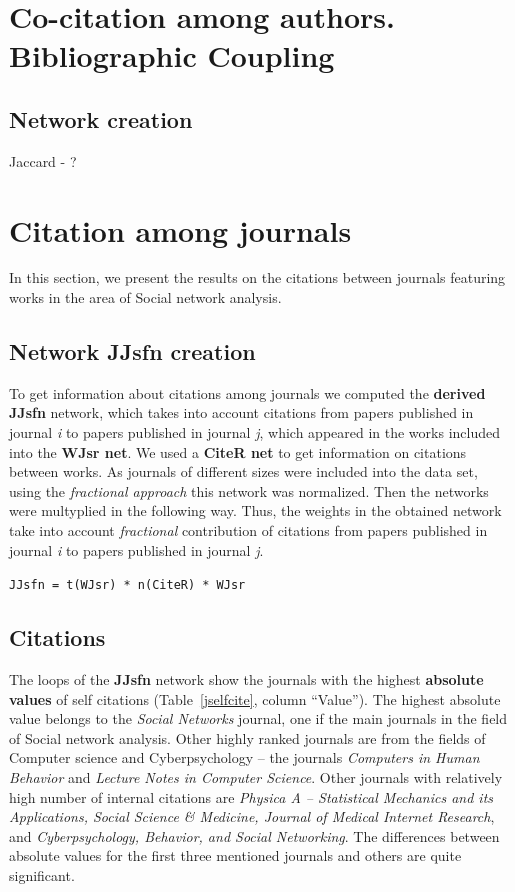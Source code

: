 \documentclass[11pt]{article} %
\newcommand{\Remark}[1]{\ifodd\value{page} \normalmarginpar
 \else \reversemarginpar \fi \marginpar{{\footnotesize #1}} }
\begin{document}
\section{Co-citation among authors. Bibliographic Coupling }

\subsection{Network creation} 

Jaccard - ? \Remark{Try to compute}

\section{Citation among journals}

In this section, we present the results on the citations between journals featuring works in the area of Social network analysis. 

\subsection{Network JJsfn creation}

To get information about citations among journals we computed the \textbf{derived JJsfn} network, which takes into account citations from papers published in journal \textit{i} to papers published in journal \textit{j}, which appeared in the works included into the \textbf{WJsr net}. We used a \textbf{CiteR net} to get information on citations between works. As journals of different sizes were included into the data set, using the \textit{fractional approach} this network was normalized. Then the networks were multyplied in the following way. Thus, the weights in the obtained network take into account \textit{fractional} contribution of citations from papers published in journal \textit{i} to papers published in journal \textit{j}.   \medskip 

\texttt{JJsfn = t(WJsr) * n(CiteR) * WJsr}

\subsection{Citations}

The loops of the \textbf{JJsfn} network show the journals with the highest \textbf{absolute values} of self citations (Table~\ref{jselfcite}, column ``Value''). The highest absolute value belongs to the \textit{Social Networks} journal, one if the main journals in the field of Social network analysis. Other highly ranked journals are from the fields of Computer science and Cyberpsychology -- the journals \textit{Computers in Human Behavior} and \textit{Lecture Notes in Computer Science}. Other journals with relatively high number of internal citations are \textit{Physica A -- Statistical Mechanics and its Applications, Social Science \& Medicine, Journal of Medical Internet Research}, and \textit{Cyberpsychology, Behavior, and Social Networking}. The differences between absolute values for the first three mentioned journals and others are quite significant.   \medskip 
\end{document}
